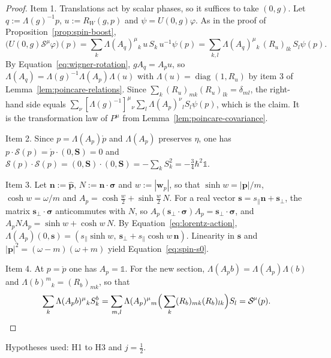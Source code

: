 \begin{proof}
	Item 1. Translations act by scalar phases, so it suffices to take $(0,g)$. Let $q:=\Lambda(g)^{-1}p$, $u:=R_W(g,p)$ and $\psi=U(0,g)\varphi$. As in the proof of Proposition~\ref{prop:spin-boost},
	\begin{equation*}
		\big(U(0,g)\mathcal{S}^\mu\varphi\big)(p)=\sum_k\Lambda(A_q)^\mu{}_k\,u\,S_k\,u^{-1}\psi(p)=\sum_{k,l}\Lambda(A_q)^\mu{}_k\,(R_u)_{lk}\,S_l\psi(p).
	\end{equation*}
	By Equation~\eqref{eq:wigner-rotation}, $gA_q=A_pu$, so $\Lambda(A_q)=\Lambda(g)^{-1}\Lambda(A_p)\Lambda(u)$ with $\Lambda(u)=\operatorname{diag}(1,R_u)$ by item 3 of Lemma~\ref{lem:poincare-relations}. Since $\sum_k(R_u)_{mk}(R_u)_{lk}=\delta_{ml}$, the right-hand side equals $\sum_\nu[\Lambda(g)^{-1}]^\mu{}_\nu\sum_l\Lambda(A_p)^\nu{}_lS_l\psi(p)$, which is the claim. It is the transformation law of $P^\mu$ from Lemma~\ref{lem:poincare-covariance}.
	
	Item 2. Since $p=\Lambda(A_p)\mathring{p}$ and $\Lambda(A_p)$ preserves $\eta$, one has $p\cdot\mathcal{S}(p)=\mathring{p}\cdot(0,\mathbf{S})=0$ and $\mathcal{S}(p)\cdot\mathcal{S}(p)=(0,\mathbf{S})\cdot(0,\mathbf{S})=-\sum_kS_k^2=-\frac34\hbar^2\mathbb{1}$.
	
	Item 3. Let $\mathbf{n}:=\hat{\mathbf{p}}$, $N:=\mathbf{n}\cdot\boldsymbol{\sigma}$ and $w:=|\mathbf{w}_p|$, so that $\sinh w=|\mathbf{p}|/m$, $\cosh w=\omega/m$ and $A_p=\cosh\frac w2+\sinh\frac w2\,N$. For a real vector $\mathbf{s}=s_\parallel\mathbf{n}+\mathbf{s}_\perp$, the matrix $\mathbf{s}_\perp\cdot\boldsymbol{\sigma}$ anticommutes with $N$, so $A_p(\mathbf{s}_\perp\cdot\boldsymbol{\sigma})A_p=\mathbf{s}_\perp\cdot\boldsymbol{\sigma}$, and $A_pNA_p=\sinh w+\cosh w\,N$. By Equation~\eqref{eq:lorentz-action}, $\Lambda(A_p)(0,\mathbf{s})=(s_\parallel\sinh w,\ \mathbf{s}_\perp+s_\parallel\cosh w\,\mathbf{n})$. Linearity in $\mathbf{s}$ and $|\mathbf{p}|^2=(\omega-m)(\omega+m)$ yield Equation~\eqref{eq:spin-s0}.
	
	Item 4. At $p=\mathring{p}$ one has $A_p=\mathbb{1}$. For the new section, $\Lambda(A_pb)=\Lambda(A_p)\Lambda(b)$ and $\Lambda(b)^m{}_k=(R_b)_{mk}$, so that
	\begin{equation*}
		\sum_k\Lambda(A_pb)^\mu{}_kS_k^b=\sum_{m,l}\Lambda(A_p)^\mu{}_m\Big(\sum_k(R_b)_{mk}(R_b)_{lk}\Big)S_l=\mathcal{S}^\mu(p).\qedhere
	\end{equation*}
\end{proof}

\noindent Hypotheses used: H1 to H3 and $j=\frac12$.

